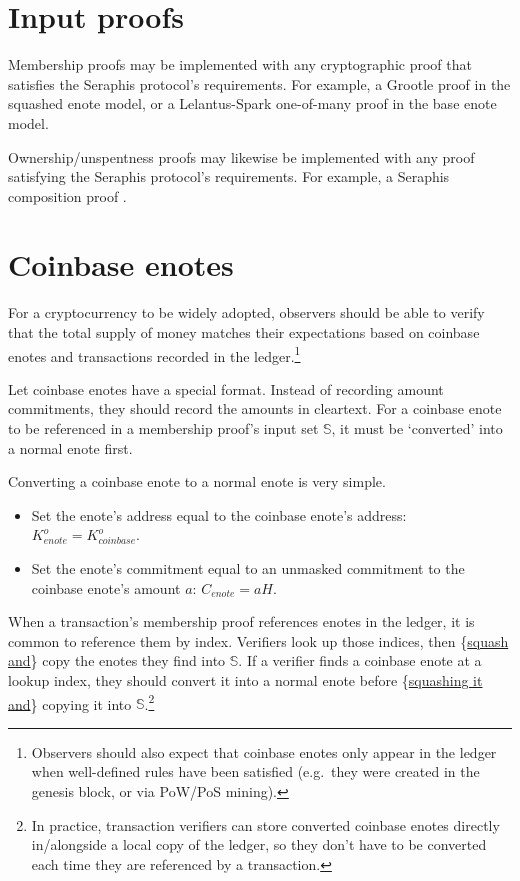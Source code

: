 \section{Input proofs}
\label{sec:input-proofs}

Membership proofs may be implemented with any cryptographic proof that satisfies the Seraphis protocol's requirements. For example, a Grootle proof \cite{seraphis} in the squashed enote model, or a Lelantus-Spark one-of-many proof \cite{lelantus-spark} in the base enote model.

Ownership/unspentness proofs may likewise be implemented with any proof satisfying the Seraphis protocol's requirements. For example, a Seraphis composition proof \cite{seraphis}.



\section{Coinbase enotes}
\label{sec:coinbase-enotes}

For a cryptocurrency to be widely adopted, observers should be able to verify that the total supply of money matches their expectations based on coinbase enotes and transactions recorded in the ledger.\footnote{Observers should also expect that coinbase enotes only appear in the ledger when well-defined rules have been satisfied (e.g.\ they were created in the genesis block, or via PoW/PoS mining).}

Let coinbase enotes have a special format. Instead of recording amount commitments, they should record the amounts in cleartext. For a coinbase enote to be referenced in a membership proof's input set $\mathbb{S}$, it must be `converted' into a normal enote first.

Converting a coinbase enote to a normal enote is very simple.
\begin{itemize}
    \item Set the enote's address equal to the coinbase enote's address: $K^o_{enote} = K^o_{coinbase}$.
    \item Set the enote's commitment equal to an unmasked commitment to the coinbase enote's amount $a$: $C_{enote} = a H$.
\end{itemize}

When a transaction's membership proof references enotes in the ledger, it is common to reference them by index. Verifiers look up those indices, then \{\ul{squash and}\} copy the enotes they find into $\mathbb{S}$. If a verifier finds a coinbase enote at a lookup index, they should convert it into a normal enote before \{\ul{squashing it and}\} copying it into $\mathbb{S}$.\footnote{In practice, transaction verifiers can store converted coinbase enotes directly in/alongside a local copy of the ledger, so they don't have to be converted each time they are referenced by a transaction.}


